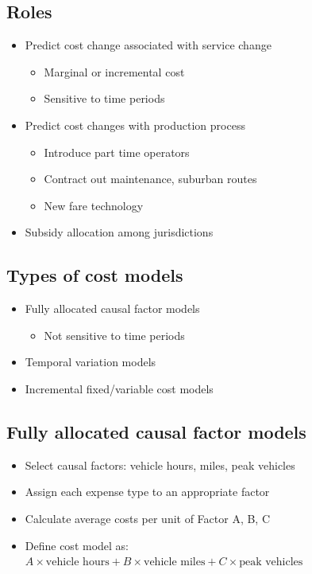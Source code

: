 \documentclass[11pt]{article}
\begin{document}
\subsection{Roles}
\label{sec:org1e8720a}
\begin{itemize}
\item Predict cost change associated with service change
\begin{itemize}
\item Marginal or incremental cost
\item Sensitive to time periods
\end{itemize}
\item Predict cost changes with production process
\begin{itemize}
\item Introduce part time operators
\item Contract out maintenance, suburban routes
\item New fare technology
\end{itemize}
\item Subsidy allocation among jurisdictions
\end{itemize}
\subsection{Types of cost models}
\label{sec:org5c1bc65}
\begin{itemize}
\item Fully allocated causal factor models
\begin{itemize}
\item Not sensitive to time periods
\end{itemize}
\item Temporal variation models
\item Incremental fixed/variable cost models
\end{itemize}
\subsection{Fully allocated causal factor models}
\label{sec:orgc47d008}
\begin{itemize}
\item Select causal factors: vehicle hours, miles, peak vehicles
\item Assign each expense type to an appropriate factor
\item Calculate average costs per unit of Factor A, B, C
\item Define cost model as: \(A \times \text{vehicle hours} + B \times \text{vehicle miles} + C \times \text{peak vehicles}\)
\end{itemize}
\end{document}
